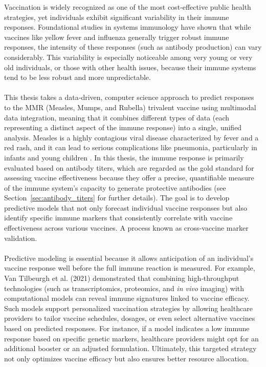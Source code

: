 \documentclass[12pt,a4paper]{report}
\newcommand{\todo}[1]{%
  \par\noindent%
  \begin{tcolorbox}[colback=yellow, colframe=black, boxrule=0.5pt, sharp corners, width=\linewidth, before skip=5pt, after skip=5pt]
    \textbf{TODO:} #1
  \end{tcolorbox}%
  \par
}
\newcommand{\remark}[1]{%
  \par\noindent%
  \begin{tcolorbox}[ colback=orange!20!white, colframe=orange!80!black, boxrule=0.5pt, sharp corners, width=\linewidth, ]
    {\textbf{\textcolor{orange!80!black}!REMARK:}}~#1
  \end{tcolorbox}%
}
\begin{document}
Vaccination is widely recognized as one of the most cost‑effective public health strategies, yet individuals exhibit significant variability in their immune responses. Foundational studies in systems immunology \cite{castrucci2018factors,brodin2017human} have shown that while vaccines like yellow fever and influenza generally trigger robust immune responses, the intensity of these responses (such as antibody production) can vary considerably. This variability is especially noticeable among very young or very old individuals, or those with other health issues, because their immune systems tend to be less robust and more unpredictable.\\
\\
This thesis takes a data‑driven, computer science approach to predict responses to the MMR (Measles, Mumps, and Rubella) trivalent vaccine using multimodal data integration, meaning that it combines different types of data (each representing a distinct aspect of the immune response) into a single, unified analysis. Measles is a highly contagious viral disease characterized by fever and a red rash, and it can lead to serious complications like pneumonia, particularly in infants and young children \cite{moss2017measles}. In this thesis, the immune response is primarily evaluated based on antibody titers, which are regarded as the gold standard for assessing vaccine effectiveness because they offer a precise, quantifiable measure of the immune system’s capacity to generate protective antibodies \cite{plotkin2010correlates} (see Section~\ref{sec:antibody_titers} for further details). The goal is to develop predictive models that not only forecast individual vaccine responses but also identify specific immune markers that consistently correlate with vaccine effectiveness across various vaccines. A process known as cross‑vaccine marker validation.\\
\\
Predictive modeling is essential because it allows anticipation of an individual’s vaccine response well before the full immune reaction is measured. For example, Van Tilbeurgh et al. (2021) \cite{vanTilbeurgh2021predictive} demonstrated that combining high‑throughput technologies (such as transcriptomics, proteomics, and \textit{in vivo} imaging) with computational models can reveal immune signatures linked to vaccine efficacy. Such models support personalized vaccination strategies by allowing healthcare providers to tailor vaccine schedules, dosages, or even select alternative vaccines based on predicted responses. For instance, if a model indicates a low immune response based on specific genetic markers, healthcare providers might opt for an additional booster or an adjusted formulation. Ultimately, this targeted strategy not only optimizes vaccine efficacy but also ensures better resource allocation.\\
\\
\end{document}
